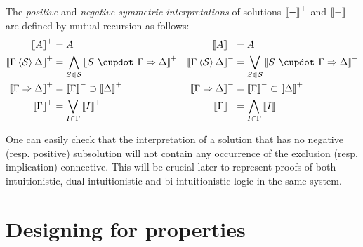 \begin{definition}
  The \emph{positive} and \emph{negative symmetric interpretations} of solutions
  $\left\llbracket - \right\rrbracket^+$ and $\left\llbracket - \right\rrbracket^-$ are defined by mutual recursion as
  follows:
  \begin{align*}
    \psint{A} &= A &
    \nsint{A} &= A \\
    \psint{\Gamma \piq{\cS} \Delta} &=
      \bigwedge_{S \in \cS} \psint{S \mix \Gamma \seq \Delta} &
    \nsint{\Gamma \piq{\cS} \Delta} &=
      \bigvee_{S \in \cS} \nsint{S \mix \Gamma \seq \Delta} \\
    \psint{\Gamma \seq \Delta} &=
      \nsint{\Gamma} \limp \psint{\Delta} &
    \nsint{\Gamma \seq \Delta} &=
      \nsint{\Gamma} \lsub \psint{\Delta} \\
    \psint{\Gamma} &= \bigvee_{I \in \Gamma}{\psint{I}} &
    \nsint{\Gamma} &= \bigwedge_{I \in \Gamma}{\nsint{I}}
  \end{align*}
\end{definition}

One can easily check that the interpretation of a solution that has no negative
(resp. positive) subsolution will not contain any occurrence of the exclusion
(resp. implication) connective. This will be crucial later to represent proofs
of both intuitionistic, dual-intuitionistic and bi-intuitionistic logic in the
same system.

\section{Designing for properties}

